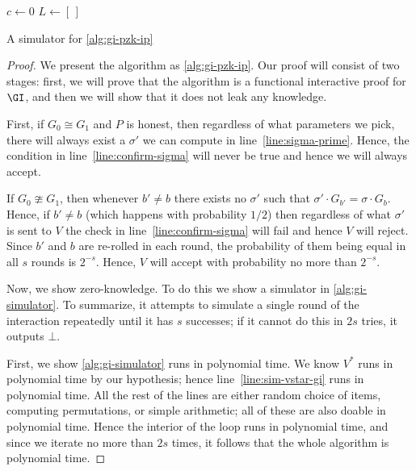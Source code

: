 \documentclass[english,12pt]{reedthesis}
\theoremstyle{plain}
\theoremstyle{definition}
\theoremstyle{remark}
\begin{document}
\begin{algorithm}[htbp]
  $c \leftarrow 0$\;
  $L \leftarrow [\,]$\;
  \KwRet{$\bot$}\;
  \caption{A simulator for \cref{alg:gi-pzk-ip}}\label{alg:gi-simulator}
\end{algorithm}

\begin{proof}
  We present the algorithm as \cref{alg:gi-pzk-ip}. Our proof will consist of
  two stages: first, we will prove that the algorithm is a functional
  interactive proof for $\GI$, and then we will show that it does not leak any
  knowledge.

  First, if $G_{0} \cong G_{1}$ and $P$ is honest, then regardless of what
  parameters we pick, there will always exist a $\sigma'$ we can compute in
  line~\ref{line:sigma-prime}. Hence, the condition in
  line~\ref{line:confirm-sigma} will never be true and hence we will always
  accept.

  If $G_{0} \ncong G_{1}$, then whenever $b' \ne b$ there exists no $\sigma'$ such that
  $\sigma' \cdot G_{b'} = \sigma \cdot G_{b}$. Hence, if $b' \ne b$ (which happens with probability
  $1/2$) then regardless of what $\sigma'$ is sent to $V$ the check in
  line~\ref{line:confirm-sigma} will fail and hence $V$ will reject. Since $b'$
  and $b$ are re-rolled in each round, the probability of them being equal in
  all $s$ rounds is $2^{-s}$. Hence, $V$ will accept with probability no more
  than $2^{-s}$.

  Now, we show zero-knowledge. To do this we show a simulator in
  \cref{alg:gi-simulator}. To summarize, it attempts to simulate a single round
  of the interaction repeatedly until it has $s$ successes; if it cannot do this
  in $2s$ tries, it outputs $\bot$.

  First, we show \cref{alg:gi-simulator} runs in polynomial time. We know
  $V^{*}$ runs in polynomial time by our hypothesis; hence
  line~\ref{line:sim-vstar-gi} runs in polynomial time. All the rest of the
  lines are either random choice of items, computing permutations, or simple
  arithmetic; all of these are also doable in polynomial time. Hence the
  interior of the loop runs in polynomial time, and since we iterate no more
  than $2s$ times, it follows that the whole algorithm is polynomial time.


\end{proof}
\end{document}
